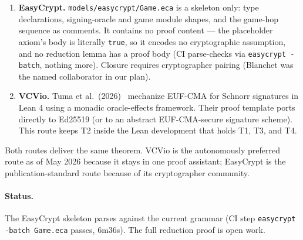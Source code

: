 \begin{enumerate}
\item \textbf{EasyCrypt.}  \texttt{models/easycrypt/Game.eca} is a
  skeleton only: type declarations, signing-oracle and game module
  shapes, and the game-hop sequence as comments.  It contains no
  proof content --- the placeholder axiom's body is literally
  \texttt{true}, so it encodes no cryptographic assumption, and no
  reduction lemma has a proof body (CI parse-checks via
  \texttt{easycrypt -batch}, nothing more).  Closure requires
  cryptographer pairing (Blanchet was the named collaborator in our
  plan).

\item \textbf{VCVio.}  Tuma et al.~(2026)~\cite{tuma2026vcvio}
  mechanize EUF-CMA for Schnorr signatures in Lean 4 using a
  monadic oracle-effects framework.  Their proof template
  ports directly to Ed25519 (or to an abstract EUF-CMA-secure
  signature scheme).  This route keeps T2 inside the Lean
  development that holds T1, T3, and T4.
\end{enumerate}

Both routes deliver the same theorem.  VCVio is the autonomously
preferred route as of May 2026 because it stays in one proof
assistant; EasyCrypt is the publication-standard route because of
its cryptographer community.

\paragraph{Status.} The EasyCrypt skeleton parses against the
current grammar (CI step \texttt{easycrypt -batch Game.eca} passes,
6m36s).  The full reduction proof is open work.
